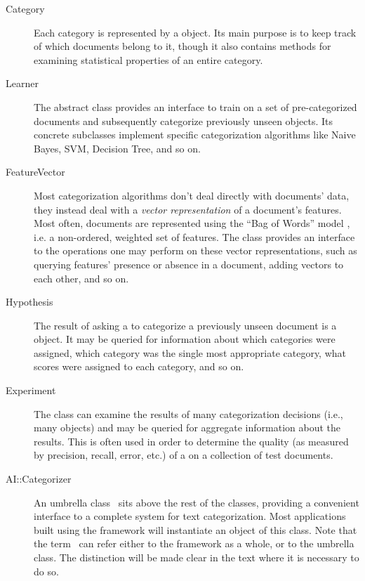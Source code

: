 \begin{description}
\item[Category]

Each category is represented by a  object.  Its main purpose
is to keep track of which documents belong to it, though it also
contains methods for examining statistical properties of an entire
category.

\item[Learner]

The abstract  class provides an interface to train on a
set of pre-categorized documents and subsequently categorize
previously unseen  objects.  Its
concrete subclasses implement specific categorization algorithms like
Naive Bayes, SVM, Decision Tree, and so on.

\item[FeatureVector]

Most categorization algorithms don't deal directly with documents'
data, they instead deal with a \emph{vector representation} of a
document's features.  Most often, documents are represented using the
``Bag of Words'' model \cite{XXX}, i.e. a non-ordered, weighted set of
features.  The  class provides an interface to the
operations one may perform on these vector representations, such as
querying features' presence or absence in a document, adding vectors
to each other, and so on.

\item[Hypothesis]

The result of asking a  to categorize a previously unseen
document is a  object.  It may be queried for information
about which categories were assigned, which category was the single
most appropriate category, what scores were assigned to each category,
and so on.

\item[Experiment]

The  class can examine the results of many categorization
decisions (i.e., many  objects) and may be queried for
aggregate information about the results.  This is often used in order
to determine the quality (as measured by precision, recall, error,
etc.) of a  on a collection of test documents.

\item[AI::Categorizer]

An umbrella class \aicat\ sits above the rest of the classes,
providing a convenient interface to a complete system for text
categorization.  Most applications built using the framework will
instantiate an object of this class.  Note that the term \aicat\ can
refer either to the framework as a whole, or to the umbrella class.
The distinction will be made clear in the text where it is necessary
to do so.

\end{description}

